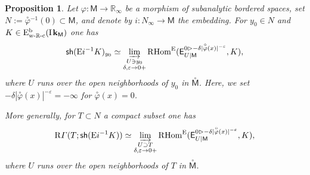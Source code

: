\documentclass[11pt]{article}
\numberwithin{equation}{section}
\newcommand{\accentset}[2]{\overset{#1}{#2}}
\theoremstyle{plain}
\newtheorem{proposition}[theorem]{Proposition}
\theoremstyle{definition}
\newcommand{\R}{\mathbb{R}}
\newcommand{\bR}{{\R_\infty}}
\newcommand{\derived}[1]{\mathrm{#1}}
\newcommand{\dere}{\derived{E}}\let\enh\dere
\newcommand{\derr}{\derived{R}}
\newcommand{\BECwRc}[2][\ifield]{\dere^{\mathrm{b}}_\wRc(#1_{#2})}
\newcommand{\RHom}[1][]{\derr\mathrm{Hom}_{\raise1.5ex\hbox to.1em{}#1}}
\newcommand{\FHom}{\RHom^\enh}
\newcommand{\Eopb}[1]{\enh#1^{-1}}
\newcommand{\wRc}{{\mathrm{w}\text-\R\text-\mathrm{c}}}
\newcommand{\field}{\mathbf{k}}\let\cor\field
\newcommand{\ind}{\mathrm{I}\mspace{2mu}}
\newcommand{\ifield}{\ind\field}
\newcommand{\unbordered}[1]{{\accentset{\circ}{#1}}}
\let\oo \unbordered
\newcommand{\inbordered}[1]{{#1_\infty}}
\newcommand{\range}[2]{#1 \mathbin{\rhd} #2}
\newcommand{\rsect}{\derr\varGamma}
\newcommand{\sh}{\mathsf{sh}}
\newcommand{\bbM}{\mathsf{M}}
\newcommand{\obM}{\unbordered{\bbM}}
\newcommand{\bN}{\inbordered{N}}
\newcommand{\defeq}{\mathbin{:=}}\let \seteq\defeq
\newcommand{\ilim}[1][]{\mathop{\varinjlim}\limits_{#1}}
\begin{document}
\begin{proposition}\label{pro:sgerm}
Let $\varphi\colon \bbM\to \bR$ be a morphism of subanalytic bordered spaces, set
$N \defeq \oo\varphi{}^{-1}(0)\subset\bbM$, and denote by $i\colon \bN\to \bbM$ the embedding.
For $y_0\in N$ and $K\in\BECwRc \bbM$ one has
\[
\sh(\Eopb i K)_{y_0} \simeq
\ilim[\substack{U\owns y_0\\\delta,\varepsilon\to0+}]\FHom(\exx^{\range0{-\delta|\oo\varphi(x)|^{-\varepsilon}}}_{U|\bbM},K),
\]
where $U$ runs over the open neighborhoods of $y_0$ in $\obM$.
Here, we set $-\delta|\oo\varphi(x)|^{-\varepsilon}=-\infty$ for $\oo\varphi(x)=0$.

More generally, for $T\subset N$ a compact subset one has
\begin{equation}
\label{eq:sectT}
\rsect(T;\sh(\Eopb i K)) \simeq
\ilim[\substack{U\supset T\\\delta,\varepsilon\to0+}]\FHom(\exx^{\range0{-\delta|\oo\varphi(x)|^{-\varepsilon}}}_{U|\bbM},K),
\end{equation}
where $U$ runs over the open neighborhoods of $T$ in $\obM$.
\end{proposition}
\end{document}
